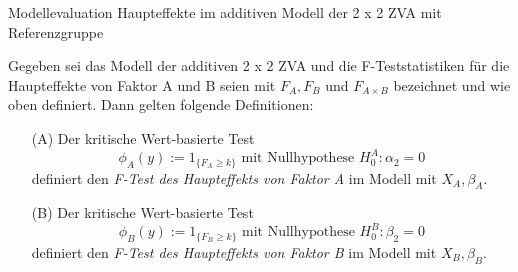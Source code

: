 \documentclass[
  8pt,
  ignorenonframetext,
]{beamer}
\begin{document}
\begin{frame}{\small Modellevaluation \textbar{} Haupteffekte im
additiven Modell der 2 x 2 ZVA mit Referenzgruppe}
\protect\hypertarget{modellevaluation-haupteffekte-im-additiven-modell-der-2-x-2-zva-mit-referenzgruppe-1}{}
\footnotesize
\begin{definition}
\justifying
Gegeben sei das Modell der additiven 2 x 2 ZVA und die F-Teststatistiken
für die Haupteffekte von Faktor A und B seien mit $F_A, F_B$ und $F_{A \times B}$
bezeichnet und wie oben definiert. Dann gelten folgende Definitionen:
\begin{itemize}
\item[(A)] Der kritische Wert-basierte Test
\begin{equation}
\phi_A(y) := 1_{\{F_A \ge k\}} \mbox{ mit Nullhypothese } H_0^A : \alpha_2 = 0
\end{equation}
definiert den \textit{F-Test des Haupteffekts von Faktor A} im Modell mit $X_A, \beta_A$.
\item[(B)] Der kritische Wert-basierte Test
\begin{equation}
\phi_B(y) := 1_{\{F_B \ge k\}} \mbox{ mit Nullhypothese } H_0^B : \beta_2 = 0
\end{equation}
definiert den \textit{F-Test des Haupteffekts von Faktor B} im Modell mit $X_B, \beta_B$.
\end{itemize}
\end{definition}
\end{frame}
\end{document}
